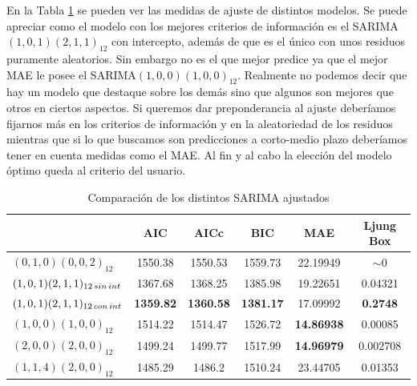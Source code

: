En la Tabla \ref{comp_2} se pueden ver las medidas de ajuste de distintos modelos. Se puede apreciar como el modelo con los mejores criterios de información es el SARIMA$(1,0,1)(2,1,1)_{12}$ con intercepto, además de que es el único con unos residuos puramente aleatorios. Sin embargo no es el que mejor predice ya que el mejor MAE le posee el SARIMA$(1,0,0)(1,0,0)_{12}$. Realmente no podemos decir que hay un modelo que destaque sobre los demás sino que algunos son mejores que otros en ciertos aspectos. Si queremos dar preponderancia al ajuste deberíamos fijarnos más en los criterios de información y en la aleatoriedad de los residuos mientras que si lo que buscamos son predicciones a corto-medio plazo deberíamos tener en cuenta medidas como el MAE. Al fin y al cabo la elección del modelo óptimo queda al criterio del usuario.
\begin{table}[]
\centering
\label{my-label}
\begin{tabular}{|l|c|c|c|c|c|}
\hline
\multicolumn{1}{|c|}{}                & AIC              & AICc             & BIC & MAE & Ljung Box \\ \hline
$(0,1,0)(0,0,2)_{12}$               & 1550.38          & 1550.53          & 1559.73                  & 22.19949                 & $\sim 0$                                   \\ \hline
$(1,0,1)(2,1,1)_{12 \thinspace sin \thinspace int}$ & 1367.68          & 1368.25          & 1385.98                  & 19.22651                 & 0.04321                                  \\ \hline
$(1,0,1)(2,1,1)_{12 \thinspace con \thinspace int}$ & \textbf{1359.82} & \textbf{1360.58} & \textbf{1381.17}         & 17.09992                 & \textbf{0.2748}                          \\ \hline
$(1,0,0)(1,0,0)_{12}$               & 1514.22          & 1514.47          & 1526.72                  & \textbf{14.86938}        & 0.00085                                   \\ \hline
$(2,0,0)(2,0,0)_{12}$                & 1499.24          & 1499.77          & 1517.99                  & \textbf{14.96979}        & 0.002708                                  \\ \hline
$(1,1,4)(2,0,0)_{12}$               & 1485.29          & 1486.2           & 1510.24                  & 23.44705                 & 0.01353                                  \\ \hline
\end{tabular}
\caption{Comparación de los distintos SARIMA ajustados}
\label{comp_2}
\end{table}

